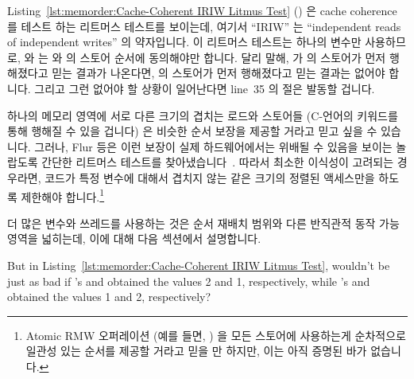 Listing~\ref{lst:memorder:Cache-Coherent IRIW Litmus Test}
()
은 cache coherence 를 테스트 하는 리트머스 테스트를 보이는데, 여기서 ``IRIW''
는 ``independent reads of independent writes'' 의 약자입니다.
이 리트머스 테스트는 하나의 변수만 사용하므로,  와  는
 와  의 스토어 순서에 동의해야만 합니다.
달리 말해,  가  의 스토어가 먼저 행해졌다고 믿는 결과가
나온다면,   의 스토어가 먼저 행해졌다고 믿는 결과는 없어야
합니다.
그리고 그런 없어야 할 상황이 일어난다면 line~35 의  절은 발동할
겁니다.

하나의 메모리 영역에 서로 다른 크기의 겹치는 로드와 스토어들 (C-언어의
 키워드를 통해 행해질 수 있을 겁니다) 은 비슷한 순서 보장을 제공할
거라고 믿고 싶을 수 있습니다.
그러나, Flur 등은 이런 보장이 실제 하드웨어에서는 위배될 수 있음을 보이는
놀랍도록 간단한 리트머스 테스트를
찾아냈습니다~\cite{Flur:2017:MCA:3093333.3009839}.
따라서 최소한 이식성이 고려되는 경우라면, 코드가 특정 변수에 대해서 겹치지 않는
같은 크기의 정렬된 액세스만을 하도록 제한해야 합니다.\footnote{
	Atomic RMW 오퍼레이션 (예를 들면, ) 을 모든 스토어에
	사용하는게 순차적으로 일관성 있는 순서를 제공할 거라고 믿을 만 하지만,
	이는 아직 증명된 바가 없습니다.}

더 많은 변수와 쓰레드를 사용하는 것은 순서 재배치 범위와 다른 반직관적 동작
가능 영역을 넓히는데, 이에 대해 다음 섹션에서 설명합니다.
\iffalse

\QuickQuiz{}
	But in
	Listing~\ref{lst:memorder:Cache-Coherent IRIW Litmus Test},
	wouldn't be just as bad if 's  and 
	obtained the values 2 and 1, respectively, while 's
	 and  obtained the values 1 and 2, respectively?
 \QuickQuizEnd

